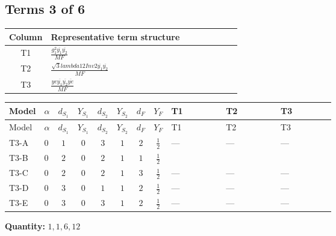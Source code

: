 \documentclass[8pt]{article}
\begin{document}
\begin{landscape}
\subsection*{Terms 3 of 6}
\begin{center}
\begin{tabular}{@{}c >{\raggedright\arraybackslash}p{0.82\linewidth}@{}}
\toprule
Column & Representative term structure \\
\midrule
T1 & \(\displaystyle \frac{g_{1}^{2} \overline{y_{1}} \overline{y_{2}}}{MF}\) \\
\midrule
T2 & \(\displaystyle \frac{\sqrt{3} lambda12Inv2 \overline{y_{1}} \overline{y_{2}}}{MF}\) \\
\midrule
T3 & \(\displaystyle \frac{ye \overline{y_{1}} \overline{y_{2}} \overline{ye}}{MF}\) \\
\midrule
\bottomrule
\end{tabular}
\end{center}
\smallskip
\tiny
\begin{longtable}{@{}llcccccc >{\raggedright\arraybackslash}p{0.21\linewidth} >{\raggedright\arraybackslash}p{0.21\linewidth} >{\raggedright\arraybackslash}p{0.21\linewidth}@{}}
\toprule
Model & $\alpha$ & $d_{S_1}$ & $Y_{S_1}$ & $d_{S_2}$ & $Y_{S_2}$ & $d_F$ & $Y_F$ & T1 & T2 & T3 \\
\midrule
\endfirsthead
\toprule
Model & $\alpha$ & $d_{S_1}$ & $Y_{S_1}$ & $d_{S_2}$ & $Y_{S_2}$ & $d_F$ & $Y_F$ & T1 & T2 & T3 \\
\midrule
\endhead
T3-A & $0$ & $1$ & $0$ & $3$ & $1$ & $2$ & $\frac{1}{2}$ & --- & --- & --- \\
\midrule
T3-B & $0$ & $2$ & $0$ & $2$ & $1$ & $1$ & $\frac{1}{2}$ & \scriptsize\adjustbox{max width=\linewidth}{$\begin{gathered} - \frac{3 g_{1}^{2} \overline{y_{1}} \overline{y_{2}}}{8 MF}\end{gathered}$} & \scriptsize\adjustbox{max width=\linewidth}{$\begin{gathered} - \frac{\sqrt{3} lambda12Inv2 \overline{y_{1}} \overline{y_{2}}}{3 MF}\end{gathered}$} & \scriptsize\adjustbox{max width=\linewidth}{$\begin{gathered} \frac{ye \overline{y_{1}} \overline{y_{2}} \overline{ye}}{4 MF}\end{gathered}$} \\
\midrule
T3-C & $0$ & $2$ & $0$ & $2$ & $1$ & $3$ & $\frac{1}{2}$ & --- & --- & --- \\
\midrule
T3-D & $0$ & $3$ & $0$ & $1$ & $1$ & $2$ & $\frac{1}{2}$ & --- & --- & --- \\
\midrule
T3-E & $0$ & $3$ & $0$ & $3$ & $1$ & $2$ & $\frac{1}{2}$ & --- & --- & --- \\
\midrule
\bottomrule
\end{longtable}
\clearpage
\noindent\textbf{Quantity: }$\mathrm{1,1,6,12}$\par\smallskip

\end{landscape}
\end{document}
